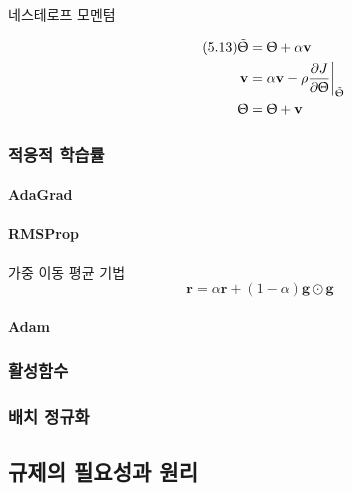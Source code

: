 \documentclass [12pt] {oblivoir}
\let\oldsubsubsection=\subsubsection
\renewcommand{\subsubsection}
{
  \filbreak
  \oldsubsubsection
}
\begin{document}
네스테로프 모멘텀

\begin{align*} \tag{5.13}
    \tilde{\Uptheta} &= \Uptheta + \alpha \mathbf{v} \\
     \mathbf{v} &= \alpha \mathbf{v} - \rho \frac{\partial J}{\partial \Uptheta}\bigg|_{\tilde{\Uptheta}} \\
    \Uptheta &= \Uptheta + \mathbf{v}
\end{align*}


\subsubsection{적응적 학습률}

\paragraph*{AdaGrad}\mbox{}

\vspace{3mm}

\paragraph*{RMSProp}\mbox{}

가중 이동 평균 기법
\begin{equation} \tag{5.14}
  \mathbf{r} = \alpha \mathbf{r} + (1 - \alpha)\mathbf{g} \odot \mathbf{g}
\end{equation}

\vspace{3mm}

\paragraph*{Adam}\mbox{}

\vspace{3mm}

\subsubsection{활성함수}

\subsubsection{배치 정규화}

\subsection{규제의 필요성과 원리}
\end{document}
